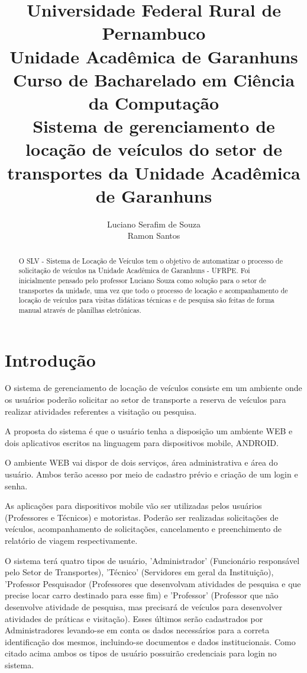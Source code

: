 \documentclass[11pt]{article}
\author{Luciano Serafim de Souza\\Ramon Santos}
\title{Universidade Federal Rural de Pernambuco\\Unidade Acadêmica de Garanhuns\\Curso de Bacharelado em Ciência da Computação\vspace{5mm}\\ {\large Sistema de gerenciamento de locação de veículos do setor de transportes da Unidade Acadêmica de Garanhuns}}
\begin{document}
\frenchspacing

\maketitle

\begin{abstract}
O SLV - Sistema de Locação de Veículos tem o objetivo de automatizar o processo de solicitação de veículos na Unidade Acadêmica de Garanhuns - UFRPE. Foi inicialmente pensado pelo professor Luciano Souza como solução para o setor de transportes da unidade, uma vez que todo o processo de locação e acompanhamento de locação de veículos para visitas didáticas técnicas e de pesquisa são feitas de forma manual através de planilhas eletrônicas. 
\end{abstract}
\section{Introdução}
O sistema de gerenciamento de locação de veículos consiste em um ambiente onde os usuários poderão solicitar ao setor de transporte a reserva de veículos para realizar atividades referentes a visitação ou pesquisa.

A proposta do sistema é que o usuário tenha a disposição um ambiente WEB e dois aplicativos escritos na linguagem para dispositivos mobile, ANDROID.

O ambiente WEB vai dispor de dois serviços, área administrativa e área do usuário. Ambos terão acesso por meio de cadastro prévio e criação de um login e senha. 

As aplicações para dispositivos mobile vão ser utilizadas pelos usuários (Professores e Técnicos) e motoristas. Poderão ser realizadas solicitações de veículos, acompanhamento de solicitações, cancelamento e preenchimento de relatório de viagem respectivamente.

O sistema terá quatro tipos de usuário, 'Administrador' (Funcionário responsável pelo Setor de Transportes), 'Técnico' (Servidores em geral da Instituição), 'Professor Pesquisador (Professores que desenvolvam atividades de pesquisa e que precise locar carro destinado para esse fim) e 'Professor' (Professor que não desenvolve atividade de pesquisa, mas precisará de veículos para desenvolver atividades de práticas e visitação). Esses últimos serão cadastrados por Administradores levando-se em conta os dados necessários para a correta identificação dos mesmos, incluindo-se documentos e dados institucionais. Como citado acima ambos os tipos de usuário possuirão credenciais para login no sistema.
\end{document}
